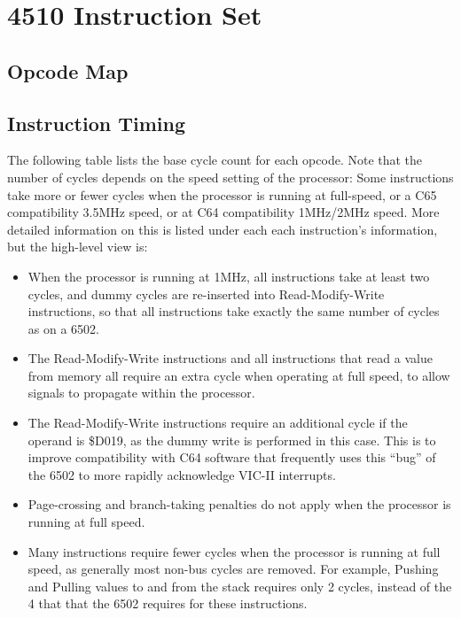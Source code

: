 


\section{4510 Instruction Set}

\subsection{Opcode Map}

\begin{center}
\end{center}

\subsection{Instruction Timing}

The following table lists the base cycle count for each opcode.
Note that the number of cycles depends on the speed setting of the
processor: Some instructions take more or fewer cycles when the
processor is running at full-speed, or a C65 compatibility 3.5MHz speed,
or at C64 compatibility 1MHz/2MHz speed.  More detailed information on
this is listed under each each instruction's information, but the high-level
view is:

\begin{itemize}
\item When the processor is running at 1MHz, all instructions take at least
  two cycles, and dummy cycles are re-inserted into Read-Modify-Write instructions,
  so that all instructions take exactly the same number of cycles as on a 6502.
\item The Read-Modify-Write instructions and all instructions that read a value from
  memory all require an extra cycle when operating at full speed, to allow signals
  to propagate within the processor.
\item The Read-Modify-Write instructions require an additional cycle if the operand
  is \$D019, as the dummy write is performed in this case.
  This is to improve compatibility with C64 software that frequently uses this
  ``bug'' of the 6502 to more rapidly acknowledge VIC-II interrupts.
\item Page-crossing and branch-taking penalties do not apply when the processor is
  running at full speed.
\item Many instructions require fewer cycles when the processor is running at full
  speed, as generally most non-bus cycles are removed. For example, Pushing and Pulling
  values to and from the stack requires only 2 cycles, instead of the 4 that that the
  6502 requires for these instructions.
\end{itemize}

